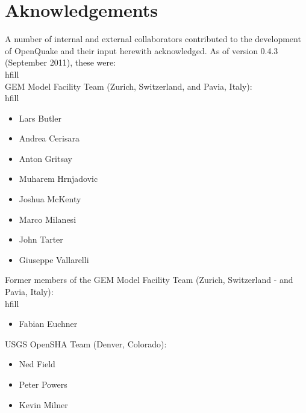 \chapter*{Aknowledgements}
A number of internal and external collaborators contributed to 
the development of OpenQuake and their input herewith acknowledged. 
As of version 0.4.3 (September 2011), these were: \\hfill \\
GEM Model Facility Team (Zurich, Switzerland, and Pavia, Italy): \\hfill \\
\begin{itemize}
\item Lars Butler
\item Andrea Cerisara
\item Anton Gritsay
\item Muharem Hrnjadovic
\item Joshua McKenty
\item Marco Milanesi
\item John Tarter
\item Giuseppe Vallarelli
\end{itemize}
Former members of the GEM Model Facility Team (Zurich, Switzerland -  
and Pavia, Italy): \\hfill \\
\begin{itemize}
\item Fabian Euchner
\end{itemize}
USGS OpenSHA Team (Denver, Colorado):
\begin{itemize}
\item Ned Field
\item Peter Powers
\item Kevin Milner
\end{itemize}

